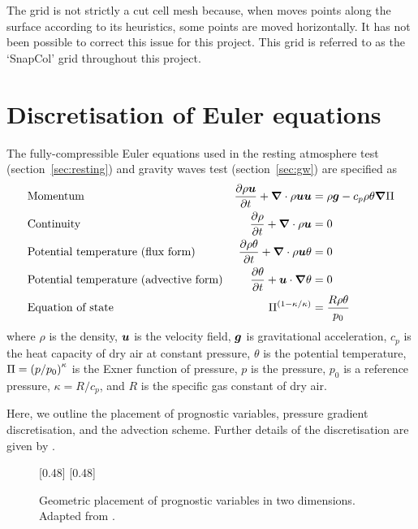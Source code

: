 The grid is not strictly a cut cell mesh because, when  moves points along the surface according to its heuristics, some points are moved horizontally.  It has not been possible to correct this issue for this project.  This grid is referred to as the `SnapCol' grid throughout this project.



\section{Discretisation of Euler equations}
\label{sec:method:discretisation}
The fully-compressible Euler equations used in the resting atmosphere test (section~\ref{sec:resting}) and gravity waves test (section~\ref{sec:gw}) are specified as
\begin{align}
	& \text{Momentum} & \frac{\partial \rho \vect{u}}{\partial t} + \del \cdot \rho \vect{u} \vect{u} &= \rho \vect{g} - c_p \rho \theta \del \exner \label{eqn:method:momentum} \\
%
& \text{Continuity} & \frac{\partial \rho}{\partial t} + \del \cdot \rho \vect{u} &= 0 \label{eqn:method:continuity} \\
%
& \text{Potential temperature (flux form)} & \frac{\partial \rho \theta}{\partial t} + \del \cdot \rho \vect{u} \theta &= 0 \\
%
& \text{Potential temperature (advective form)} & \frac{\partial \theta}{\partial t} + \vect{u} \cdot \del \theta &= 0 \\
%
& \text{Equation of state} & \exner^{(1 - \kappa / \kappa)} &= \frac{R \rho \theta}{p_0}
\end{align}
where $\rho$ is the density, $\bm{u}$ is the velocity field, $\bm{g}$ is gravitational acceleration, $c_p$ is the heat capacity of dry air at constant pressure, $\theta$ is the potential temperature, $\Pi = \left( p / p_0 \right)^\kappa$ is the Exner function of pressure, $p$ is the pressure, $p_0$ is a reference pressure, $\kappa = R/c_p$, and $R$ is the specific gas constant of dry air.

Here, we outline the placement of prognostic variables, pressure gradient discretisation, and the advection scheme.  Further details of the discretisation are given by \textcite{weller-shahrokhi2014}.

\begin{figure}
	\captionsetup[subfigure]{position=b}
	\centering
	[0.48\textwidth]{}
	\hfill
	[0.48\textwidth]{}
	\caption{Geometric placement of prognostic variables in two dimensions.  Adapted from \textcite{weller-shahrokhi2014}.}
	\label{fig:method:placement}
\end{figure}

